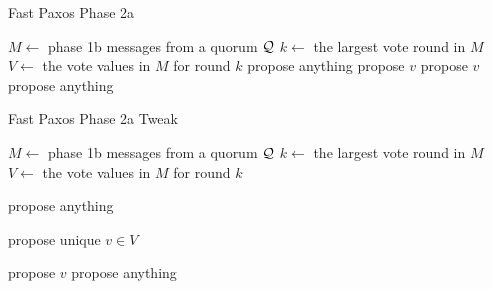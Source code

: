 \begin{minipage}[t]{0.47\textwidth}
  \begin{algorithm}[H]
    \caption{Fast Paxos Phase 2a}%
    \begin{algorithmic}[1]
      \State $M \gets$ phase 1b messages from a quorum $\mathcal{Q}$
      \State $k \gets$ the largest vote round in $M$
      \State $V \gets$ the vote values in $M$ for round $k$
      \State propose anything
      \State propose $v$
      \State propose $v$
      \Else{}
      \State propose anything
      \EndIf{}
    \end{algorithmic}
  \end{algorithm}
\end{minipage}%
\hspace{0.06\textwidth}%
\begin{minipage}[t]{0.47\textwidth}
  \begin{algorithm}[H]
    \caption{Fast Paxos Phase 2a Tweak}%
    \begin{algorithmic}[1]
      \State $M \gets$ phase 1b messages from a quorum $\mathcal{Q}$
      \State $k \gets$ the largest vote round in $M$
      \State $V \gets$ the vote values in $M$ for round $k$

      \State propose anything
      \EndIf{}

      \State propose unique $v \in V$
      \EndIf{}

      \State propose $v$
      \Else{}
      \State propose anything
      \EndIf{}
    \end{algorithmic}
  \end{algorithm}
\end{minipage}
